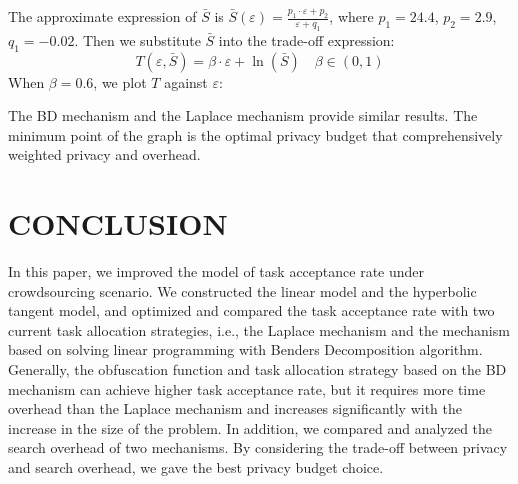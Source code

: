The approximate expression of $\bar{S}$ is $\bar{S}(\varepsilon)=\frac{p_1 \cdot \varepsilon + p_2}{\varepsilon+q_1}$, where $p_1=24.4$, $p_2=2.9$, $q_1=-0.02$. Then we substitute $\bar{S}$ into the trade-off expression:
$$
	T(\varepsilon , \bar{S})=\beta \cdot \varepsilon + \ln (\bar{S}) \quad \beta \in (0,1)
$$
When $\beta=0.6$, we plot $T$ against $\varepsilon$:

The BD mechanism and the Laplace mechanism provide similar results. The minimum point of the graph is the optimal privacy budget that comprehensively weighted privacy and overhead.

\section{CONCLUSION} %
In this paper, we improved the model of task acceptance rate under crowdsourcing scenario. We constructed the linear model and the hyperbolic tangent model, and optimized and compared the task acceptance rate with two current task allocation strategies, i.e., the Laplace mechanism and the mechanism based on solving linear programming with Benders Decomposition algorithm. Generally, the obfuscation function and task allocation strategy based on the BD mechanism can achieve higher task acceptance rate, but it requires more time overhead than the Laplace mechanism and increases significantly with the increase in the size of the problem. In addition, we compared and analyzed the search overhead of two mechanisms. By considering the trade-off between privacy and search overhead, we gave the best privacy budget choice.
